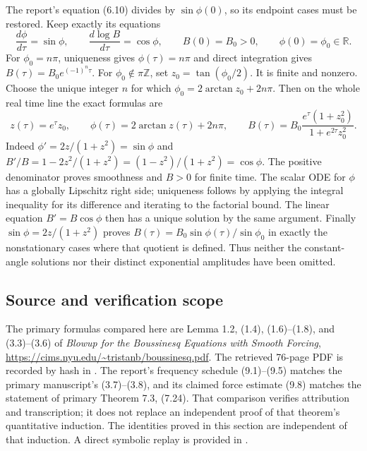 The report's equation (6.10) divides by $\sin\phi(0)$, so its endpoint
cases must be restored. Keep exactly its equations
\[
 \frac{d\phi}{d\tau}=\sin\phi,\qquad
 \frac{d\log B}{d\tau}=\cos\phi,\qquad B(0)=B_0>0,
 \qquad\phi(0)=\phi_0\in\mathbb R.
\]
For $\phi_0=n\pi$, uniqueness gives $\phi(\tau)=n\pi$ and direct
integration gives $B(\tau)=B_0e^{(-1)^n\tau}$.
For $\phi_0\notin\pi\mathbb Z$, set $z_0=\tan(\phi_0/2)$.
It is finite and nonzero. Choose the unique integer $n$ for which
$\phi_0=2\arctan z_0+2n\pi$. Then on the whole real time line the
exact formulas are
\[
 z(\tau)=e^\tau z_0,\qquad
 \phi(\tau)=2\arctan z(\tau)+2n\pi,\qquad
 B(\tau)=B_0\frac{e^\tau(1+z_0^2)}{1+e^{2\tau}z_0^2}.
\]
Indeed $\phi'=2z/(1+z^2)=\sin\phi$ and
$B'/B=1-2z^2/(1+z^2)=(1-z^2)/(1+z^2)=\cos\phi$.
The positive denominator proves smoothness and $B>0$ for finite time.
The scalar ODE for $\phi$ has a globally Lipschitz right side; uniqueness
follows by applying the integral inequality for its difference and
iterating to the factorial bound. The linear equation $B'=B\cos\phi$
then has a unique solution by the same argument.
Finally $\sin\phi=2z/(1+z^2)$ proves
$B(\tau)=B_0\sin\phi(\tau)/\sin\phi_0$ in exactly the nonstationary
cases where that quotient is defined. Thus neither the constant-angle
solutions nor their distinct exponential amplitudes have been omitted.

\subsection{Source and verification scope}
The primary formulas compared here are Lemma 1.2, (1.4), (1.6)--(1.8),
and (3.3)--(3.6) of
\emph{Blowup for the Boussinesq Equations with Smooth Forcing},
\url{https://cims.nyu.edu/~tristanb/boussinesq.pdf}.
The retrieved 76-page PDF is recorded by hash in
.
The report's frequency schedule (9.1)--(9.5) matches the primary
manuscript's (3.7)--(3.8), and its claimed force estimate (9.8) matches
the statement of primary Theorem 7.3, (7.24). That comparison verifies
attribution and transcription; it does not replace an independent proof
of that theorem's quantitative induction. The identities proved in this
section are independent of that induction. A direct symbolic replay is
provided in .
